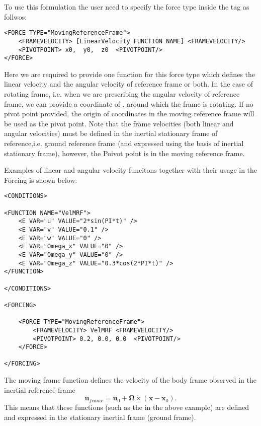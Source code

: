 To use this formulation the user need to specify the force type inside the  tag as follwos:

\begin{lstlisting}[style=XMLStyle]
<FORCE TYPE="MovingReferenceFrame">
    <FRAMEVELOCITY> [LinearVelocity FUNCTION NAME] <FRAMEVELOCITY/>
    <PIVOTPOINT> x0,  y0,  z0  <PIVOTPOINT/>
</FORCE>
\end{lstlisting}

Here we are required to provide one function for this force type which defines the linear velocity and the angular velocity of reference frame or both. In the case of rotating frame, i.e. when we are prescribing the angular velocity of reference frame, we can provide a coordinate of , around which the frame is rotating. If no pivot point provided, the origin of coordinates in the moving reference frame will be used as the pivot point.
Note that the frame velocities (both linear and angular velocities) must be defined in the inertial stationary frame of reference,i.e. ground reference frame (and expressed using the basis of inertial stationary frame), however, the Poivot point is in the moving reference frame.

Examples of linear and angular velocity funcitons together with their usage in the Forcing is shown below:

\begin{lstlisting}[style=XMLStyle]
<CONDITIONS>

<FUNCTION NAME="VelMRF">
    <E VAR="u" VALUE="2*sin(PI*t)" />
    <E VAR="v" VALUE="0.1" />
    <E VAR="w" VALUE="0" />
    <E VAR="Omega_x" VALUE="0" />
    <E VAR="Omega_y" VALUE="0" />
    <E VAR="Omega_z" VALUE="0.3*cos(2*PI*t)" />
</FUNCTION>

</CONDITIONS>

<FORCING>

    <FORCE TYPE="MovingReferenceFrame">
        <FRAMEVELOCITY> VelMRF <FRAMEVELOCITY/>
        <PIVOTPOINT> 0.2, 0.0, 0.0  <PIVOTPOINT/>
    </FORCE>

</FORCING>
\end{lstlisting}


The moving frame function defines the velocity of the body frame observed in the inertial reference frame $$\mathbf{u}_{frame} = \mathbf{u}_0 + \mathbf{\Omega}\times (\mathbf{x}-\mathbf{x}_0).$$ This means that these functions (such as the  in the above example) are defined and expressed in the stationary inertial frame (ground frame).

